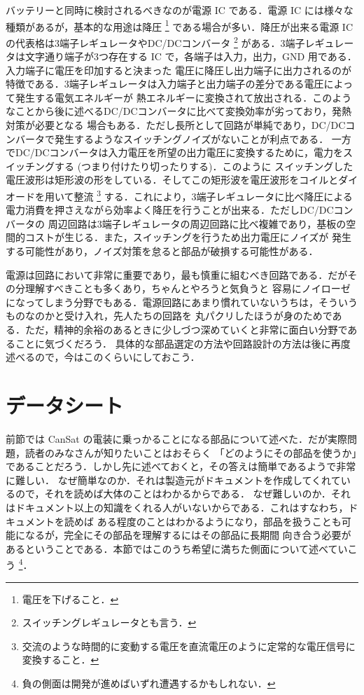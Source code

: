 \documentclass[dvipdfmx]{jsbook}
\begin{document}
  バッテリーと同時に検討されるべきなのが電源 IC である．電源 IC には様々な種類があるが，基本的な用途は降圧
  \footnote{電圧を下げること．}
  である場合が多い．降圧が出来る電源 IC の代表格は3端子レギュレータやDC/DCコンバータ
  \footnote{スイッチングレギュレータとも言う．}
  がある．3端子レギュレータは文字通り端子が3つ存在する IC で，各端子は入力，出力，GND 用である．入力端子に電圧を印加すると決まった
  電圧に降圧し出力端子に出力されるのが特徴である．3端子レギュレータは入力端子と出力端子の差分である電圧によって発生する電気エネルギーが
  熱エネルギーに変換されて放出される．このようなことから後に述べるDC/DCコンバータに比べて変換効率が劣っており，発熱対策が必要となる
  場合もある．ただし長所として回路が単純であり，DC/DCコンバータで発生するようなスイッチングノイズがないことが利点である．
  一方でDC/DCコンバータは入力電圧を所望の出力電圧に変換するために，電力をスイッチングする (つまり付けたり切ったりする)．このように
  スイッチングした電圧波形は矩形波の形をしている．そしてこの矩形波を電圧波形をコイルとダイオードを用いて整流
  \footnote{交流のような時間的に変動する電圧を直流電圧のように定常的な電圧信号に変換すること．}
  する．これにより，3端子レギュレータに比べ降圧による電力消費を押さえながら効率よく降圧を行うことが出来る．ただしDC/DCコンバータの
  周辺回路は3端子レギュレータの周辺回路に比べ複雑であり，基板の空間的コストが生じる．また，スイッチングを行うため出力電圧にノイズが
  発生する可能性があり，ノイズ対策を怠ると部品が破損する可能性がある．

  電源は回路において非常に重要であり，最も慎重に組むべき回路である．だがその分理解すべきことも多くあり，ちゃんとやろうと気負うと
  容易にノイローゼになってしまう分野でもある．電源回路にあまり慣れていないうちは，そういうものなのかと受け入れ，先人たちの回路を
  丸パクリしたほうが身のためである．ただ，精神的余裕のあるときに少しづつ深めていくと非常に面白い分野であることに気づくだろう．
  具体的な部品選定の方法や回路設計の方法は後に再度述べるので，今はこのくらいにしておこう．

\section{データシート}

  前節では CanSat の電装に乗っかることになる部品について述べた．だが実際問題，読者のみなさんが知りたいことはおそらく
  「どのようにその部品を使うか」であることだろう．しかし先に述べておくと，その答えは簡単であるようで非常に難しい．
  なぜ簡単なのか．それは製造元がドキュメントを作成してくれているので，それを読めば大体のことはわかるからである．
  なぜ難しいのか．それはドキュメント以上の知識をくれる人がいないからである．これはすなわち，ドキュメントを読めば
  ある程度のことはわかるようになり，部品を扱うことも可能になるが，完全にその部品を理解するにはその部品に長期間
  向き合う必要があるということである．本節ではこのうち希望に満ちた側面について述べていこう
  \footnote{負の側面は開発が進めばいずれ遭遇するかもしれない．}．
\end{document}
